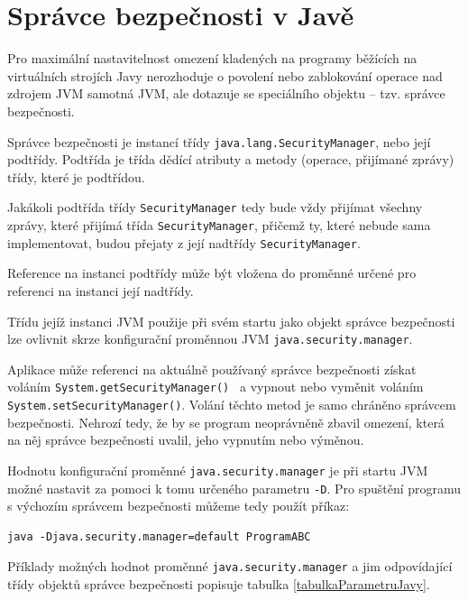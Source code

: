 \section{Správce bezpečnosti v Javě} \label{securityManager}

Pro maximální nastavitelnost omezení kladených na programy běžících na virtuálních strojích Javy nerozhoduje o povolení nebo zablokování operace nad zdrojem JVM samotná JVM, ale dotazuje se speciálního objektu -- tzv. správce bezpečnosti.

Správce bezpečnosti je instancí třídy {\tt java.lang.SecurityManager}, nebo její podtřídy. Podtřída je třída dědící atributy a metody (operace, přijímané zprávy) třídy, které je podtřídou.

Jakákoli podtřída třídy {\tt SecurityManager} tedy bude vždy přijímat všechny zprávy, které přijímá třída {\tt SecurityManager}, přičemž ty, které nebude sama implementovat, budou přejaty z její nadtřídy {\tt SecurityManager}.

Reference na instanci podtřídy může být vložena do proměnné určené pro referenci na instanci její nadtřídy.

Třídu jejíž instanci JVM použije při svém startu jako objekt správce bezpečnosti lze ovlivnit skrze konfigurační proměnnou JVM {\tt java.security.manager}.

Aplikace může referenci na aktuálně používaný správce bezpečnosti získat voláním {\tt System.getSecurityManager() } a vypnout nebo vyměnit voláním {\tt System.setSecurityManager()}. Volání těchto metod je samo chráněno správcem bezpečnosti. Nehrozí tedy, že by se program neoprávněně zbavil omezení, která na něj správce bezpečnosti uvalil, jeho vypnutím nebo výměnou.

Hodnotu konfigurační proměnné {\tt java.security.manager} je při startu JVM možné nastavit za pomoci k tomu určeného parametru {\tt -D}. Pro spuštění programu s výchozím správcem bezpečnosti můžeme tedy použít příkaz:

\begin{lstlisting}[caption=Příkaz spouštějící program s výchozím správcem bezpečnosti, label=smEx]
java -Djava.security.manager=default ProgramABC
\end{lstlisting}

Příklady možných hodnot proměnné {\tt java.security.manager} a jim odpovídající třídy objektů správce bezpečnosti popisuje tabulka \ref{tabulkaParametruJavy}.

